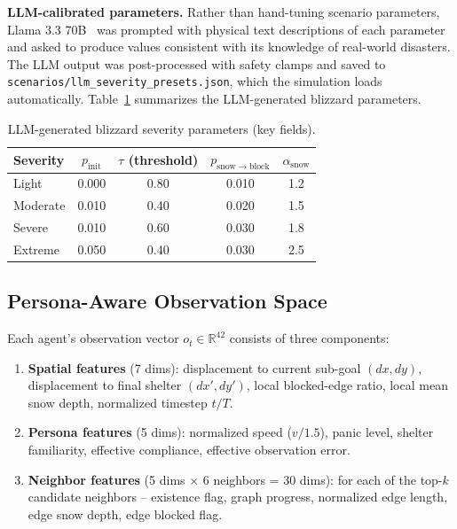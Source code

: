 \documentclass[11pt]{article}
\begin{document}
\textbf{LLM-calibrated parameters.} Rather than hand-tuning scenario parameters, Llama 3.3 70B~\cite{meta2024llama3} was prompted with physical text descriptions of each parameter and asked to produce values consistent with its knowledge of real-world disasters. The LLM output was post-processed with safety clamps and saved to \texttt{scenarios/llm\_severity\_presets.json}, which the simulation loads automatically. Table~\ref{tab:llm_params} summarizes the LLM-generated blizzard parameters.

\begin{table}[h]
\centering
\caption{LLM-generated blizzard severity parameters (key fields).}
\label{tab:llm_params}
\begin{tabular}{lcccc}
\toprule
\textbf{Severity} & $p_{\mathrm{init}}$ & $\tau$ (threshold) & $p_{\mathrm{snow\rightarrow block}}$ & $\alpha_{\mathrm{snow}}$ \\
\midrule
Light    & 0.000 & 0.80 & 0.010 & 1.2 \\
Moderate & 0.010 & 0.40 & 0.020 & 1.5 \\
Severe   & 0.010 & 0.60 & 0.030 & 1.8 \\
Extreme  & 0.050 & 0.40 & 0.030 & 2.5 \\
\bottomrule
\end{tabular}
\end{table}

\subsection{Persona-Aware Observation Space}

Each agent's observation vector $o_t \in \mathbb{R}^{42}$ consists of three components:

\begin{enumerate}
  \item \textbf{Spatial features} (7 dims): displacement to current sub-goal $(dx, dy)$, displacement to final shelter $(dx', dy')$, local blocked-edge ratio, local mean snow depth, normalized timestep $t / T$.
  \item \textbf{Persona features} (5 dims): normalized speed ($v / 1.5$), panic level, shelter familiarity, effective compliance, effective observation error.
  \item \textbf{Neighbor features} (5 dims $\times$ 6 neighbors = 30 dims): for each of the top-$k$ candidate neighbors -- existence flag, graph progress, normalized edge length, edge snow depth, edge blocked flag.
\end{enumerate}
\end{document}
